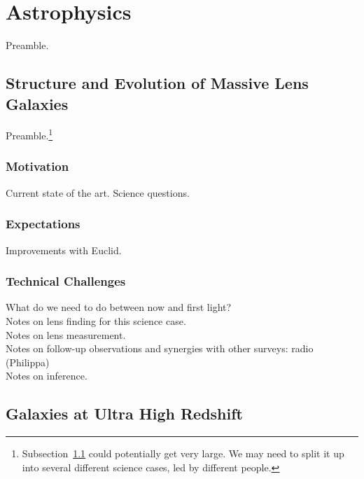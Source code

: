 \documentclass[twocolumn]{svjour3}
\begin{document}
\section{Astrophysics}

Preamble.



\subsection{Structure and Evolution of Massive Lens Galaxies}
\label{sec:lensgalaxies}



Preamble.\footnote{Subsection~\ref{sec:lensgalaxies} could potentially
get very large. We may need to split it up into several different
science cases, led by different people.}

\subsubsection{Motivation}
Current state of the art. Science questions.\\

\subsubsection{Expectations}
Improvements with Euclid.\\

\subsubsection{Technical Challenges}
What do we need to do between now and first light?\\
Notes on lens finding for this science case.\\
Notes on lens measurement.\\
Notes on follow-up observations and synergies with other surveys: radio
(Philippa) \\
Notes on inference.\\


\subsection{Galaxies at Ultra High Redshift}
\end{document}
